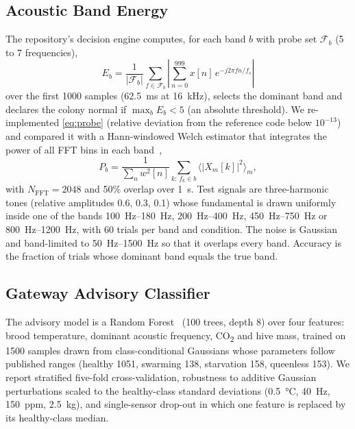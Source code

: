 \documentclass[conference]{IEEEtran}
\newcommand{\COtwo}{CO\textsubscript{2}}
\begin{document}
\subsection{Acoustic Band Energy}\label{sec:m-acoustic}
The repository's decision engine computes, for each band $b$ with probe set $\mathcal{F}_b$ (5 to 7 frequencies),
\begin{equation}
E_b = \frac{1}{|\mathcal{F}_b|}\sum_{f\in\mathcal{F}_b}\left|\sum_{n=0}^{999} x[n]\, e^{-j2\pi f n/f_s}\right|
\label{eq:probe}
\end{equation}
over the first 1000 samples (\SI{62.5}{ms} at \SI{16}{kHz}), selects the dominant band and declares the colony normal if $\max_b E_b < 5$ (an absolute threshold). We re-implemented \eqref{eq:probe} (relative deviation from the reference code below $10^{-13}$) and compared it with a Hann-windowed Welch estimator that integrates the power of all FFT bins in each band~\cite{harris1978,welch1967},
\begin{equation}
P_b = \frac{1}{\sum_n w^2[n]}\sum_{k:\,f_k\in b}\big\langle |X_m[k]|^2 \big\rangle_m,
\label{eq:fft}
\end{equation}
with $N_\mathrm{FFT} = 2048$ and 50\% overlap over \SI{1}{s}. Test signals are three-harmonic tones (relative amplitudes 0.6, 0.3, 0.1) whose fundamental is drawn uniformly inside one of the bands \SIrange{100}{180}{Hz}, \SIrange{200}{400}{Hz}, \SIrange{450}{750}{Hz} or \SIrange{800}{1200}{Hz}, with 60 trials per band and condition. The noise is Gaussian and band-limited to \SIrange{50}{1500}{Hz} so that it overlaps every band. Accuracy is the fraction of trials whose dominant band equals the true band.

\subsection{Gateway Advisory Classifier}\label{sec:m-rf}
The advisory model is a Random Forest~\cite{breiman2001,pedregosa2011} (100 trees, depth 8) over four features: brood temperature, dominant acoustic frequency, \COtwo{} and hive mass, trained on 1500 samples drawn from class-conditional Gaussians whose parameters follow published ranges (healthy 1051, swarming 138, starvation 158, queenless 153). We report stratified five-fold cross-validation, robustness to additive Gaussian perturbations scaled to the healthy-class standard deviations (\SI{0.5}{\celsius}, \SI{40}{Hz}, \SI{150}{ppm}, \SI{2.5}{kg}), and single-sensor drop-out in which one feature is replaced by its healthy-class median.
\end{document}
